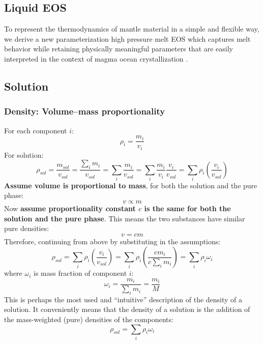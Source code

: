 \subsection{Liquid EOS}
To represent the thermodynamics of mantle material in a simple and flexible way, we derive a new parameterization high pressure melt EOS which captures melt behavior while retaining physically meaningful parameters that are easily interpreted in the context of magma ocean crystallization \citep{WB18}.
\subsection{Solution}
\subsubsection{Density: Volume--mass proportionality}
For each component $i$:
\begin{equation}
\rho_i = \frac{m_i}{v_i}
\end{equation}
For solution:
\begin{equation}
\rho_{sol}=\frac{m_{sol}}{v_{sol}} = \frac{\sum_i m_i}{v_{sol}} = \sum_i \frac{m_i}{v_{sol}} = \sum_i \frac{m_i}{v_i} \frac{v_i}{v_{sol}} = \sum_i \rho_i \left( \frac{v_i}{v_{sol}} \right)
\end{equation}
\textbf{Assume volume is proportional to mass}, for both the solution and the pure phase:
\begin{equation}
v \propto m
\end{equation}
Now \textbf{assume proportionality constant $c$ is the same for both the solution and the pure phase}.  This means the two substances have similar pure densities:
\begin{equation}
v = c m
\end{equation}
Therefore, continuing from above by substituting in the assumptions:
\begin{equation}
\rho_{sol}=\sum_i \rho_i \left( \frac{v_i}{v_{sol}} \right) = \sum_i \rho_i \left( \frac{c m_i}{c \sum_i m_i} \right) = \sum_i \rho_i \omega_i
\end{equation}
where $\omega_i$ is mass fraction of component $i$:
\begin{equation}
\omega_i = \frac{m_i}{\sum_i m_i} = \frac{m_i}{M}
\end{equation}
This is perhaps the most used and ``intuitive'' description of the density of a solution.  It conveniently means that the density of a solution is the addition of the mass-weighted (pure) densities of the components:
\begin{equation}
\rho_{sol}=\sum_i \rho_i \omega_i
\end{equation}
